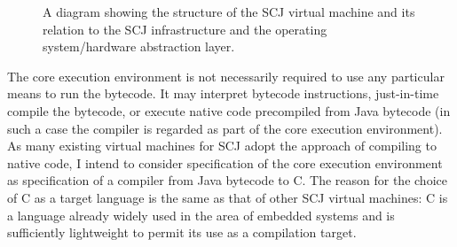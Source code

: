 \documentclass[a4paper,10pt]{article}
\begin{document}
\begin{figure}[ht]
  \centering
  \caption{A diagram showing the structure of the SCJ virtual machine and its
    relation to the SCJ infrastructure and the operating system/hardware
    abstraction layer.}
  \label{scjvm-fig}
\end{figure}

The core execution environment is not necessarily required to use any particular
means to run the bytecode.  It may interpret bytecode instructions, just-in-time
compile the bytecode, or execute native code precompiled from Java bytecode (in
such a case the compiler is regarded as part of the core execution
environment). As many existing virtual machines for SCJ adopt the approach of
compiling to native code, I intend to consider specification of the core
execution environment as specification of a compiler from Java bytecode to
C. The reason for the choice of C as a target language is the same as that of
other SCJ virtual machines: C is a language already widely used in the area of
embedded systems and is sufficiently lightweight to permit its use as a
compilation target.
\end{document}
